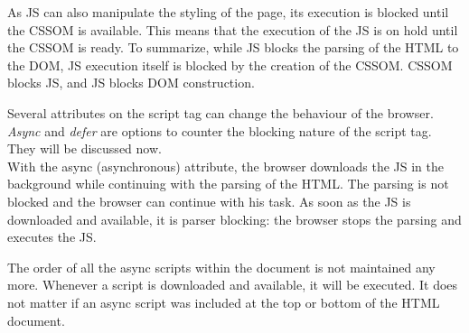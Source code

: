 



As JS can also manipulate the styling of the page, its execution is blocked until the CSSOM is available.
This means that the execution of the JS is on hold until the CSSOM is ready.
To summarize, while JS blocks the parsing of the HTML to the DOM, JS execution itself is blocked by the creation of the CSSOM.
CSSOM blocks JS, and JS blocks DOM construction. %

Several attributes on the script tag can change the behaviour of the browser.
\textit{Async} and \textit{defer} are options to counter the blocking nature of the script tag.
They will be discussed now.\\




With the async (asynchronous) attribute, the browser downloads the JS in the background while continuing with the parsing of the HTML.
The parsing is not blocked and the browser can continue with his task. 
As soon as the JS is downloaded and available,  it is parser blocking: the browser stops the parsing and executes the JS.%

The order of all the async scripts within the document is not maintained any more.
Whenever a script is downloaded and available, it will be executed.
It does not matter if an async script was included at the top or bottom of the HTML document. %





